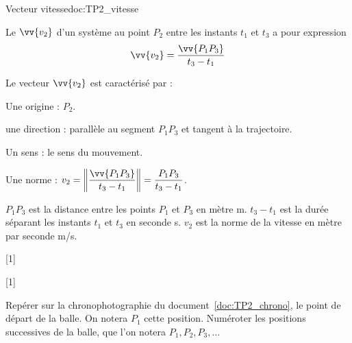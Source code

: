 \begin{doc}{Vecteur vitesse}{doc:TP2_vitesse}
  \begin{importants}
    Le  $\vv{v_2}$ d'un système au point $P_2$ entre les instants $t_1$ et $t_3$ a pour expression
    \begin{equation*}
      \vv{v_2} = \frac{\vv{P_1 P_3}}{t_3 - t_1}
    \end{equation*}
  \end{importants}
  
  Le vecteur $\vv{v_2}$ est caractérisé par :
  \vspace*{-8pt}
  \begin{multicols}{2}
  \begin{listePoints}
    \item Une origine : $P_2$.
    \item une direction : parallèle au segment $P_1 P_3$ et tangent à la trajectoire.
    \item Un sens : le sens du mouvement.
    \item Une norme : $v_2 
    = \displaystyle \norm{\frac{\vv{P_1 P_3}}{t_3 - t_1}}
    = \displaystyle \frac{P_1 P_3}{t_3 - t_1}$.
  \end{listePoints}
  \end{multicols}
  
  $P_1 P_3$ est la distance entre les points $P_1$ et $P_3$ en mètre \unit{\m}.
  $t_3 - t_1$ est la durée séparant les instants $t_1$ et $t_3$ en seconde \unit{\s}.
  $v_2$ est la norme de la vitesse en mètre par seconde \unit{\m/\s}.
\end{doc}


\vspace*{-4pt}

%
[1]

%
[1]



%
\mesure
Repérer sur la chronophotographie du document~\ref{doc:TP2_chrono}, le point de départ de la balle.
On notera $P_1$ cette position.
Numéroter les positions successives de la balle, que l'on notera $P_1, P_2, P_3, \ldots$

